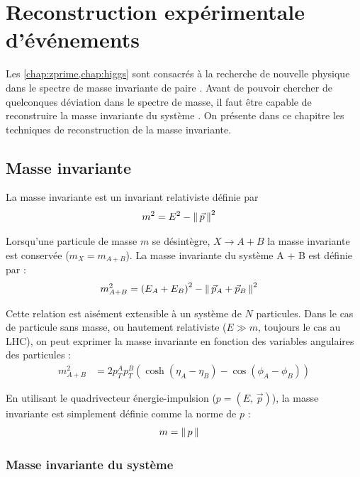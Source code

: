 \chapter{Reconstruction expérimentale d'événements \ttbar}

Les \cref{chap:zprime,chap:higgs} sont consacrés à la recherche de nouvelle physique dans le spectre de masse invariante de paire \ttbar. Avant de pouvoir chercher de quelconques déviation dans le spectre de masse, il faut être capable de reconstruire la masse invariante du système \ttbar. On présente dans ce chapitre les techniques de reconstruction de la masse invariante.

\section{Masse invariante}

La masse invariante est un invariant relativiste définie par
\begin{align*}
  m^2 &= E^2 - \left\lVert \, \vec{p} \, \right\rVert^2
\end{align*}

Lorsqu'une particule de masse $m$ se désintègre, $X \rightarrow A + B$ la masse invariante est conservée ($m_X = m_{A + B}$). La masse invariante du système A + B est définie par :
\begin{align*}
  m_{A + B}^2 &= \left( E_A + E_B \right)^2 - \left\lVert \,  \vec{p}_A + \vec{p}_B  \, \right\rVert^2
\end{align*}

Cette relation est aisément extensible à un système de $N$ particules. Dans le cas de particule sans masse, ou hautement relativiste ($E \gg m$, toujours le cas au LHC), on peut exprimer la masse invariante en fonction des variables angulaires des particules :
\begin{align*}
  m_{A + B}^2 &= 2 p_T^A p_T^B \left( \cosh{\left( \eta_A - \eta_B \right)} - \cos{\left( \phi_A - \phi_B \right)} \right)
\end{align*}

En utilisant le quadrivecteur énergie-impulsion ($p = \left(E,\,\vec{p}\right)$), la masse invariante est simplement définie comme la norme de $p$ :
\begin{align*}
  m &= \left\lVert \, p \, \right\rVert
\end{align*}

\subsection{Masse invariante du système \ttbar}

